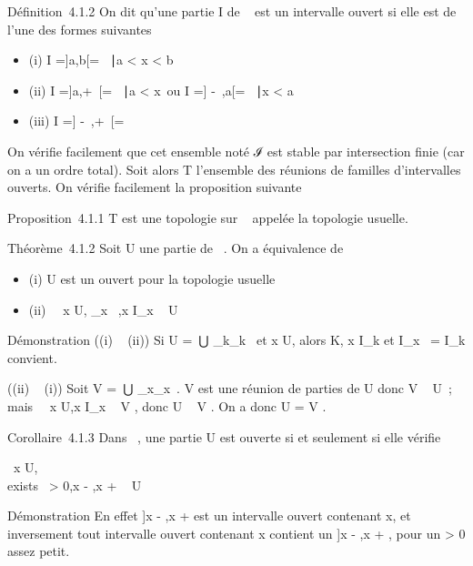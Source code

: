 \documentclass[]{article}
\begin{document}
Définition~4.1.2 On dit qu'une partie I de ~ est un intervalle ouvert si
elle est de l'une des formes suivantes

\begin{itemize}
\itemsep1pt\parskip0pt
\item
  (i) I ={]}a,b{[}= \x \in {}~∣a
  \textless{} x \textless{} b\
\item
  (ii) I ={]}a,+\infty~{[}= \x \in
  ~∣a \textless{} x\ ou I
  ={]} -\infty~,a{[}= \x \in {}~∣x
  \textless{} a\
\item
  (iii) I ={]} -\infty~,+\infty~{[}= ~
\end{itemize}

On vérifie facilement que cet ensemble noté ℐ est stable par
intersection finie (car on a un ordre total). Soit alors T l'ensemble
des réunions de familles d'intervalles ouverts. On vérifie facilement la
proposition suivante

Proposition~4.1.1 T est une topologie sur ~ appelée la topologie
usuelle.

Théorème~4.1.2 Soit U une partie de ~. On a équivalence de

\begin{itemize}
\itemsep1pt\parskip0pt
\item
  (i) U est un ouvert pour la topologie usuelle
\item
  (ii) \forall~~x \in U,
  \existsI\_x~ ,\quad x \in
  I\_x \subset~ U
\end{itemize}

Démonstration ((i) \rigtharrow~ (ii)) Si U =\
⋃  \_k\inKI\_k~ et x \in U, alors
\existsk \in K, x \in I\_k et I\_x~ =
I\_k convient.

((ii) \rigtharrow~ (i)) Soit V =\
⋃  \_x\inUI\_x~. V est une
réunion de parties de U donc V \subset~ U~; mais \forall~~x \in
U,x \in I\_x \subset~ V , donc U \subset~ V . On a donc U = V \inT.

Corollaire~4.1.3 Dans ~, une partie U est ouverte si et seulement si
elle vérifie

\forall~x \in U, \\exists~\epsilon
\textgreater{} 0,\quad {]}x - \epsilon,x + \epsilon{[}\subset~ U

Démonstration En effet {]}x - \epsilon,x + \epsilon{[} est un intervalle ouvert
contenant x, et inversement tout intervalle ouvert contenant x contient
un {]}x - \epsilon,x + \epsilon{[}, pour un \epsilon \textgreater{} 0 assez petit.
\end{document}
